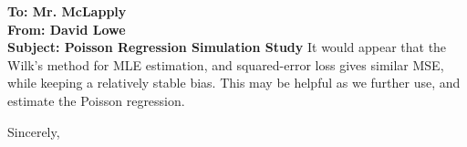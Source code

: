 \documentclass{letter}
\begin{document}
\begin{letter}{\large \bfseries To: Mr. McLapply \\ From: David Lowe \\ Subject: Poisson Regression Simulation Study}
It would appear that the Wilk's method for MLE estimation, and squared-error loss gives similar MSE, while keeping a relatively stable bias. This may be helpful as we further use, and estimate the Poisson regression. 


\closing{Sincerely,}
\end{letter}
\end{document}
